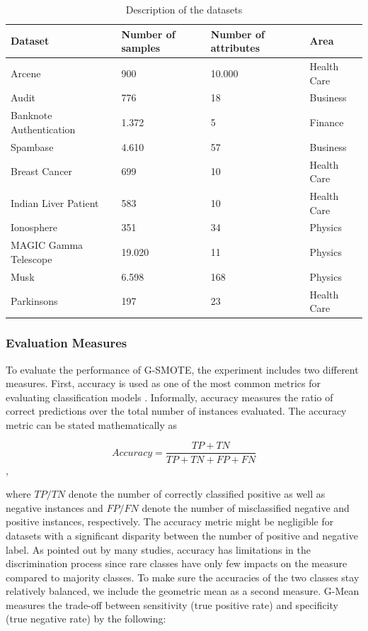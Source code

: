 \documentclass[parskip=full]{scrartcl}
\begin{document}
\begin{table}[H]
	\centering
	\begin{tabular}{|l|l|l|l|}
		\hline
		\textbf{Dataset} & \textbf{Number of samples} & \textbf{Number of attributes} & \textbf{Area} \\
		\hline
		Arcene & 900 & 10.000 & Health Care \\
		\hline
		Audit & 776 & 18 & Business \\
		\hline
		Banknote Authentication & 1.372 & 5 & Finance \\
		\hline
		Spambase & 4.610 & 57 & Business\\
		\hline
		Breast Cancer & 699 & 10 & Health Care\\
		\hline
		Indian Liver Patient & 583 & 10 & Health Care\\
		\hline
		Ionosphere & 351 & 34 & Physics\\
		\hline
		MAGIC Gamma Telescope & 19.020 & 11 & Physics\\
		\hline
		Musk & 6.598 & 168 & Physics\\
		\hline
		Parkinsons & 197 & 23 & Health Care\\
		\hline
	\end{tabular}
\caption{\label{tab:datasets}Description of the datasets}
\end{table}

\subsubsection{Evaluation Measures}

To evaluate the performance of G-SMOTE, the experiment includes two different measures. First, accuracy is used as one of the most common metrics for evaluating classification models \cite{M.2015}. Informally, accuracy measures the ratio of correct predictions over the total number of instances evaluated. The accuracy metric can be stated mathematically as

\[Accuracy = \frac{TP + TN}{TP + TN + FP + FN}\],

where $\mathit{TP/TN}$ denote the number of correctly classified positive as well as negative instances and $\mathit{FP/FN}$ denote the number of misclassified negative and positive instances, respectively. The accuracy metric might be negligible for datasets with a significant disparity between the number of positive and negative label. As pointed out by many studies, accuracy has limitations in the discrimination process since rare classes have only few impacts on the measure compared to majority classes. To make sure the accuracies of the two classes stay relatively balanced, we include the geometric mean as a second measure. G-Mean measures the trade-off between sensitivity (true positive rate) and specificity (true negative rate) by the following:
\end{document}
